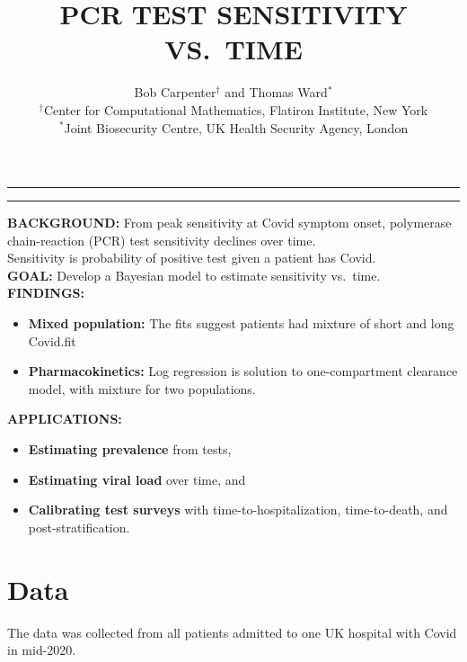 \documentclass[plainboxedsections]{sciposter}
\title{\titlesize\bfseries
  \vspace*{24pt}
  PCR TEST SENSITIVITY VS.\ TIME
}
\author{
  \begin{center}
  \LARGE Bob Carpenter$^\dagger$ and Thomas Ward$^*$  \\
  \vspace*{12pt}
  \normalsize
  $^\dagger$Center for Computational Mathematics, Flatiron Institute, New York
  \\
  $^*$Joint Biosecurity Centre, UK Health Security Agency, London
  \vspace*{-48pt}
  \end{center}
}
\begin{document}

\setlength{\fboxrule}{6pt}
\setlength{\fboxsep}{9pt}
    \maketitle
    \hspace*{-1in}
{\hrule height 4pt}
\hrule
\vspace*{12pt}
\begin{multicols}{2}
\begin{mdframed}[hidealllines = true, backgroundcolor = Cerulean!10]
{\large
\textbf{BACKGROUND:} From peak sensitivity at Covid symptom onset,
polymerase chain-reaction (PCR) test sensitivity declines over time.
\\[12pt]
Sensitivity is probability of positive test given a patient has Covid.
\\[24pt]
\textbf{GOAL:} Develop a Bayesian model to estimate sensitivity vs.\ time.
\\[24pt]
\textbf{FINDINGS:}
\begin{itemize}
\item {\bfseries Mixed population:} The fits suggest patients had mixture of short and long Covid.fit
\item {\bfseries Pharmacokinetics:} Log regression is solution to one-compartment clearance model, with mixture for two populations.
\end{itemize}
\vspace*{18pt}
\textbf{APPLICATIONS:}
\begin{itemize}
\item {\bfseries Estimating prevalence} from tests,
\item {\bfseries Estimating viral load} over time, and
\item {\bfseries Calibrating test surveys} with time-to-hospitalization,
  time-to-death, and post-stratification.
\end{itemize}
}
\end{mdframed}

\section{Data}

The data was collected from all patients admitted to one UK hospital with
Covid in mid-2020.


\end{multicols}
\end{document}
